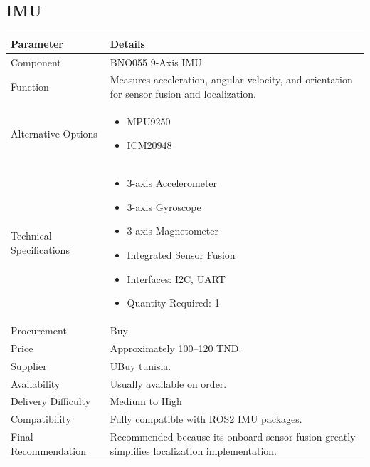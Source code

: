 \documentclass[12pt,a4paper]{article}
\begin{document}
\subsection{IMU}

\begin{longtable}{|p{4cm}|p{10cm}|}
\hline
\textbf{Parameter} & \textbf{Details} \\
\hline

Component &
BNO055 9-Axis IMU \\
\hline

Function &
Measures acceleration, angular velocity, and orientation for sensor fusion and localization. \\
\hline

Alternative Options &
\begin{itemize}
\item MPU9250
\item ICM20948
\end{itemize}
\\
\hline

Technical Specifications &
\begin{itemize}
\item 3-axis Accelerometer
\item 3-axis Gyroscope
\item 3-axis Magnetometer
\item Integrated Sensor Fusion
\item Interfaces: I2C, UART
\item Quantity Required: 1
\end{itemize}
\\
\hline

Procurement &
Buy \\
\hline

Price &
Approximately 100--120 TND. \\
\hline

Supplier &
UBuy tunisia. \\
\hline

Availability &
Usually available on order. \\
\hline

Delivery Difficulty &
Medium to High \\
\hline

Compatibility &
Fully compatible with ROS2 IMU packages. \\
\hline

Final Recommendation &
Recommended because its onboard sensor fusion greatly simplifies localization implementation. \\
\hline

\end{longtable}
\end{document}
